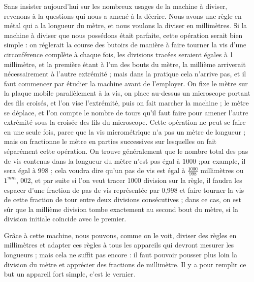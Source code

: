 \documentclass[a4paper, 12pt]{article} %
\begin{document}
Sans insister aujourd'hui sur les nombreux usages de la machine à diviser, revenons à la questions qui nous a amené à la décrire. Nous avons une règle en métal qui a la longueur du mètre, et nous voulons la diviser en millimètres. Si la machine à diviser que nous possédons était parfaite, cette opération serait bien simple : on réglerait la course des butoirs de manière à faire tourner la vis d'une circonférence complète à chaque fois, les divisions tracées seraient égales à 1 millimètre, et la première étant à l'un des bouts du mètre, la millième arriverait nécessairement à l'autre extrémité ; mais dans la pratique cela n'arrive pas, et il faut commencer par étudier la machine avant de l'employer. On fixe le mètre sur la plaque mobile parallèlement à la vis, on place au-dessus un microscope portant des fils croisés, et l'on vise l'extrémité, puis on fait marcher la machine ; le mètre se déplace, et l'on compte le nombre de tours qu'il faut faire pour amener l'autre extrémité sous la croisée des fils du microscope. Cette opération ne peut se faire en une seule fois, parce que la vis micrométrique n'a pas un mètre de longueur ; mais on fractionne le mètre en parties successives sur lesquelles on fait séparément cette opération. On trouve généralement que le nombre total des pas de vis contenus dans la longueur du mètre n'est pas égal à 1000 ;par example, il sera égal à 998 ; cela voudra dire qu'un pas de vis est égal à $\frac{1000}{998}$ millimètres ou $1^{mm}$, 002, et par suite si l'on veut tracer 1000 division sur la règle, il faudra les espacer d'une fraction de pas de vis représentée par 0,998 et faire tourner la vis de cette fraction de tour entre deux divisions consécutives ; dans ce cas, on est sûr que la millième division tombe exactement au second bout du mètre, si la division initiale coïncide avec le premier.

Grâce à cette machine, nous pouvons, comme on le voit, diviser des règles en millimètres et adapter ces règles à tous les appareils qui devront mesurer les longueurs ; mais cela ne suffit pas encore : il faut pouvoir pousser plus loin la division du mètre et apprécier des fractions de millimètre. Il y a pour remplir ce but un appareil fort simple, c'est le vernier.
\end{document}
